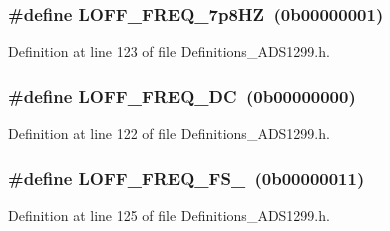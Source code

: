 \subsubsection[{\texorpdfstring{L\+O\+F\+F\+\_\+\+F\+R\+E\+Q\+\_\+7p8\+HZ}{LOFF_FREQ_7p8HZ}}]{\setlength{\rightskip}{0pt plus 5cm}\#define L\+O\+F\+F\+\_\+\+F\+R\+E\+Q\+\_\+7p8\+HZ~(0b00000001)}\hypertarget{group__Definitions__ADS1299_gaecc7fd6b62148228d2657531feb87a2a}{}\label{group__Definitions__ADS1299_gaecc7fd6b62148228d2657531feb87a2a}


Definition at line 123 of file Definitions\+\_\+\+A\+D\+S1299.\+h.

\subsubsection[{\texorpdfstring{L\+O\+F\+F\+\_\+\+F\+R\+E\+Q\+\_\+\+DC}{LOFF_FREQ_DC}}]{\setlength{\rightskip}{0pt plus 5cm}\#define L\+O\+F\+F\+\_\+\+F\+R\+E\+Q\+\_\+\+DC~(0b00000000)}\hypertarget{group__Definitions__ADS1299_gad7df75a5d4ad6b65e5b56bb0fd7cd81e}{}\label{group__Definitions__ADS1299_gad7df75a5d4ad6b65e5b56bb0fd7cd81e}


Definition at line 122 of file Definitions\+\_\+\+A\+D\+S1299.\+h.

\subsubsection[{\texorpdfstring{L\+O\+F\+F\+\_\+\+F\+R\+E\+Q\+\_\+\+F\+S\+\_\+4}{LOFF_FREQ_FS_4}}]{\setlength{\rightskip}{0pt plus 5cm}\#define L\+O\+F\+F\+\_\+\+F\+R\+E\+Q\+\_\+\+F\+S\+\_~(0b00000011)}\hypertarget{group__Definitions__ADS1299_gacd0137898658760009f19c444fd2f59e}{}\label{group__Definitions__ADS1299_gacd0137898658760009f19c444fd2f59e}


Definition at line 125 of file Definitions\+\_\+\+A\+D\+S1299.\+h.

